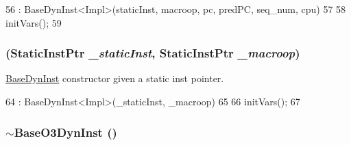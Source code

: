 \begin{DoxyCode}
56     : BaseDynInst<Impl>(staticInst, macroop, pc, predPC, seq_num, cpu)
57 {
58     initVars();
59 }
\end{DoxyCode}
\hypertarget{classBaseO3DynInst_a4acf223059c6703b6e26b41824a4af8a}{
\subsubsection[{BaseO3DynInst}]{ ({\bf StaticInstPtr} {\em \_\-staticInst}, \/  {\bf StaticInstPtr} {\em \_\-macroop})}}
\label{classBaseO3DynInst_a4acf223059c6703b6e26b41824a4af8a}
\hyperlink{classBaseDynInst}{BaseDynInst} constructor given a static inst pointer. 


\begin{DoxyCode}
64     : BaseDynInst<Impl>(_staticInst, _macroop)
65 {
66     initVars();
67 }
\end{DoxyCode}
\hypertarget{classBaseO3DynInst_a67df2d50125950a5dfd6d291df59ddc3}{
\subsubsection[{$\sim$BaseO3DynInst}]{\setlength{\rightskip}{0pt plus 5cm}$\sim${\bf BaseO3DynInst} ()}}
\label{classBaseO3DynInst_a67df2d50125950a5dfd6d291df59ddc3}



